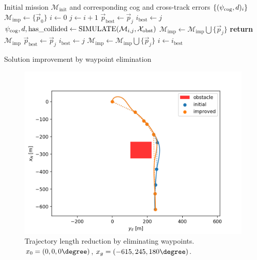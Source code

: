 \begin{algorithm}
    \begin{algorithmic}
        \Require Initial mission $\mathcal{M}_{\text{init}}$ and corresponding \ac{cog} and cross-track errors $\{(\psi_{\text{cog}},d)_i\}$
        \State $\mathcal{M}_{\text{imp}}\gets \{\vec{p}_0\}$
        \State $i\gets 0$
            \State $j\gets i+1$
            \State $\vec{p}_{\text{best}}\gets\vec{p}_j$
            \State $i_{\text{best}}\gets j$
                \State $\psi_{\text{cog}},d,\text{has\_collided}\gets\text{SIMULATE}(\mathcal{M}_{i,j}, \mathcal{X}_{\text{obst}})$
                        \State $\mathcal{M}_{\text{imp}}\gets \mathcal{M}_{\text{imp}} \bigcup \{\vec{p}_j\}$
                        \State \textbf{return} $\mathcal{M}_{\text{imp}}$
                    \EndIf
                    \State $\vec{p}_{\text{best}}\gets\vec{p}_j$
                    \State $i_{\text{best}}\gets j$
                \EndIf
            \EndWhile
            \State $\mathcal{M}_{\text{imp}}\gets \mathcal{M}_{\text{imp}} \bigcup \{\vec{p}_j\}$
            \State $i\gets i_{\text{best}}$
        \EndWhile 
    \end{algorithmic}
    \caption{Solution improvement by waypoint elimination}
    \label{alg:imp}
\end{algorithm}

\begin{figure}
    \begin{center}
        \includegraphics[width=\linewidth]{fig/sol_improved}
        \caption{Trajectory length reduction by eliminating waypoints. $x_0=(0,0,0\degree)$, $x_g=(-615, 245, 180\degree)$.}
        \label{fig:imp}
    \end{center}
\end{figure}

